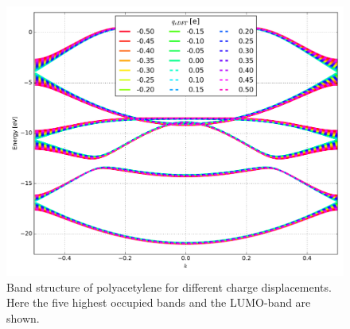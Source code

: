 \begin{figure}
	\centering
	\includegraphics[width = 13cm]{Images/polyacetylene/charging/band_structure_q_1}
	\caption{Band structure of polyacetylene for different charge displacements. Here the five highest occupied bands and the LUMO-band are shown.}
	\label{image_polyacetylene_band_structure_charging}
\end{figure}




